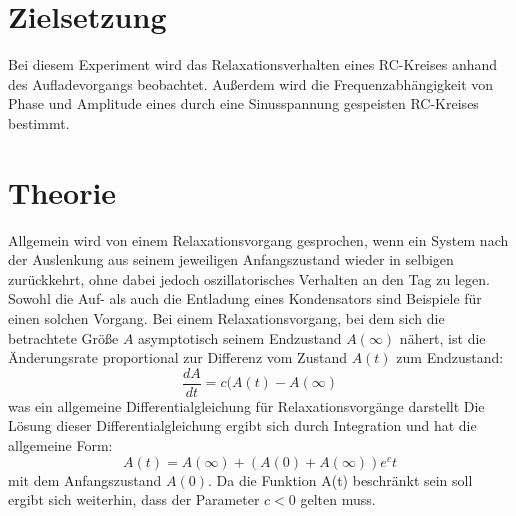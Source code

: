 \section{Zielsetzung}
Bei diesem Experiment wird das Relaxationsverhalten eines RC-Kreises anhand des Aufladevorgangs beobachtet. Außerdem wird die Frequenzabhängigkeit von Phase
und Amplitude eines durch eine Sinusspannung gespeisten RC-Kreises bestimmt.
\section{Theorie}
Allgemein wird von einem Relaxationsvorgang gesprochen, wenn ein System nach der Auslenkung aus seinem jeweiligen Anfangszustand wieder in selbigen 
zurückkehrt, ohne dabei jedoch oszillatorisches Verhalten an den Tag zu legen. Sowohl die Auf- als auch die Entladung eines Kondensators sind
Beispiele für einen solchen Vorgang. Bei einem Relaxationsvorgang, bei dem sich die betrachtete Größe $A$ asymptotisch seinem Endzustand $A(\infty)$
nähert, ist die Änderungsrate proportional zur Differenz vom Zustand $A(t)$ zum Endzustand:
\begin{equation*}
\frac{dA}{dt}=c(A(t)-A(\infty)
\end{equation*}
was ein allgemeine Differentialgleichung für Relaxationsvorgänge darstellt
Die Lösung dieser Differentialgleichung ergibt sich durch Integration und hat die allgemeine Form:
\begin{equation}
A(t)=A(\infty)+(A(0)+A(\infty))e^ct
\label{eq:allgemeine Relaxationsgleichung}
\end{equation}
mit dem Anfangszustand $A(0)$. Da die Funktion A(t) beschränkt sein soll ergibt sich weiterhin, dass der Parameter $c<0$ gelten muss.
